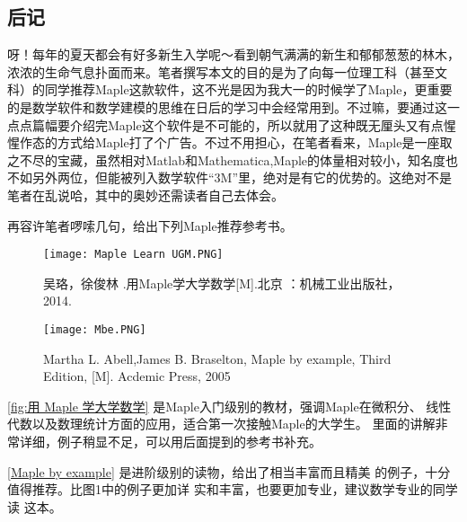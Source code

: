 \onecolumn
\setlength{\parindent}{2em}
\begin{large}
    \section*{后记}

    \begin{spacing}{1.5}
        \indent 呀！每年的夏天都会有好多新生入学呢～看到朝气满满的新生和郁郁葱葱的林木，浓浓的生命气息扑面而来。笔者撰写本文的目的是为了向每一位理工科（甚至文科）的同学推荐Maple这款软件，这不光是因为我大一的时候学了Maple，更重要的是数学软件和数学建模的思维在日后的学习中会经常用到。不过嘛，要通过这一点点篇幅要介绍完Maple这个软件是不可能的，所以就用了这种既无厘头又有点惺惺作态的方式给Maple打了个广告。不过不用担心，在笔者看来，Maple是一座取之不尽的宝藏，虽然相对Matlab和Mathematica,Maple的体量相对较小，知名度也不如另外两位，但能被列入数学软件“3M”里，绝对是有它的优势的。这绝对不是笔者在乱说哈，其中的奥妙还需读者自己去体会。

        再容许笔者啰嗦几句，给出下列Maple推荐参考书。

        \begin{figure}[htbp]
            \centering
            \begin{minipage}[t]
                {0.45\textwidth}
                \centering
                \texttt{[image: Maple Learn UGM.PNG]}
                \caption{吴珞，徐俊林
                .用Maple学大学数学[M].北京
                ：机械工业出版社，2014. }

                \label{fig:用 Maple 学大学数学}
            \end{minipage}
            \quad
            \begin{minipage}[t]
                {0.45\textwidth}
                \centering
                \texttt{[image: Mbe.PNG]}
                \caption{Martha L. Abell,James B. Braselton, Maple by example, Third Edition, [M]. Acdemic Press, 2005}
                \label{Maple by example}
            \end{minipage}
        \end{figure}
        \autoref{fig:用 Maple 学大学数学} 是Maple入门级别的教材，强调Maple在微积分、
        线性代数以及数理统计方面的应用，适合第一次接触Maple的大学生。
        里面的讲解非常详细，例子稍显不足，可以用后面提到的参考书补充。

        \autoref{Maple by example} \cite[Maple by example]{abell2005maple} 是进阶级别的读物，给出了相当丰富而且精美
        的例子，十分值得推荐。比图1中的例子更加详
        实和丰富，也要更加专业，建议数学专业的同学读
        这本。


\end{spacing}
\end{large}
